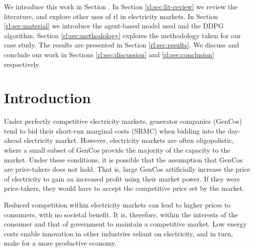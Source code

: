 

We introduce this work in Section \label{rl:sec:introduction}. In Section \ref{rl:sec:lit-review} we review the literature, and explore other uses of \acrfull{rl} in electricity markets. In Section \ref{rl:sec:material} we introduce the agent-based model used and the DDPG algorithm. Section \ref{rl:sec:methodology} explores the methodology taken for our case study. The results are presented in Section \ref{rl:sec:results}. We discuss and conclude our work in Sections \ref{rl:sec:discussion} and \ref{rl:sec:conclusion} respectively. 



\section{Introduction}
\label{rl:sec:introduction}


Under perfectly competitive electricity markets, generator companies (GenCos) tend to bid their short-run marginal costs (SRMC) when bidding into the day-ahead electricity market. However, electricity markets are often oligopolistic, where a small subset of GenCos provide the majority of the capacity to the market. Under these conditions, it is possible that the assumption that GenCos are price-takers does not hold. That is, large GenCos artificially increase the price of electricity to gain an increased profit using their market power. If they were price-takers, they would have to accept the competitive price set by the market.

Reduced competition within electricity markets can lead to higher prices to consumers, with no societal benefit. It is, therefore, within the interests of the consumer and that of government to maintain a competitive market. Low energy costs enable innovation in other industries reliant on electricity, and in turn, make for a more productive economy. %

